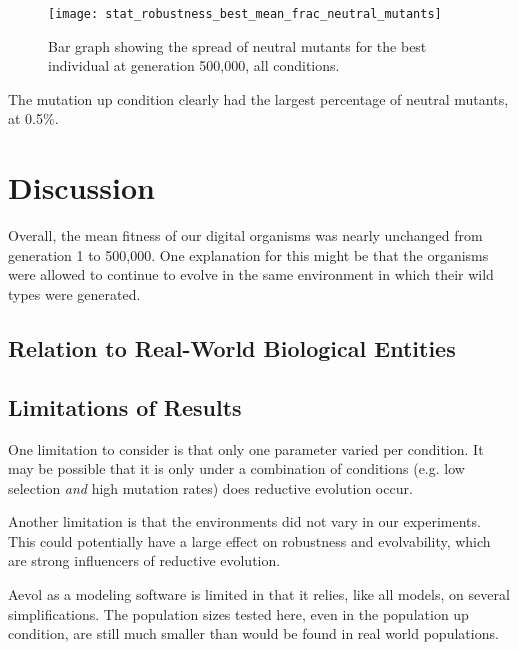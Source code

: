 \begin{figure}[H]
	\centering
	\texttt{[image: stat\_robustness\_best\_mean\_frac\_neutral\_mutants]}
	\caption[Robustness bar graph]{Bar graph showing the spread of neutral mutants for the best individual at generation 500,000, all conditions.}
	\label{fig:mean_robustness_all_conditions}
\end{figure}
The mutation up condition clearly had the largest percentage of neutral mutants, at 0.5\%. 
\section{Discussion}\label{discussion}
Overall, the mean fitness of our digital organisms was nearly unchanged from generation 1 to 500,000. One explanation for this might be that the organisms were allowed to continue to evolve in the same environment in which their wild types were generated. 
\subsection{Relation to Real-World Biological Entities}
\subsection{Limitations of Results}\label{limitations}
One limitation to consider is that only one parameter varied per condition. It may be possible that it is only under a combination of conditions (e.g. low selection \textit{and} high mutation rates) does reductive evolution occur. 

Another limitation is that the environments did not vary in our experiments. This could potentially have a large effect on robustness and evolvability, which are strong influencers of reductive evolution. 

Aevol as a modeling software is limited in that it relies, like all models, on several simplifications. The population sizes tested here, even in the population up condition, are still much smaller than would be found in real world populations. 